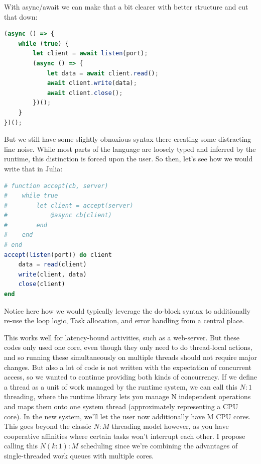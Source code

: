 \documentclass{juliacon}
\begin{document}
With async/await we can make that a bit clearer with better structure and cut that down:
\begin{lstlisting}[language = JavaScript]
(async () => {
    while (true) {
        let client = await listen(port);
        (async () => {
            let data = await client.read();
            await client.write(data);
            await client.close();
        })();
    }
})();
\end{lstlisting}

But we still have some slightly obnoxious syntax there creating some distracting line noise. While most parts of the language are loosely typed and inferred by the runtime, this distinction is forced upon the user. So then, let's see how we would write that in Julia:

\begin{lstlisting}[language = Julia]
# function accept(cb, server)
#    while true
#        let client = accept(server)
#            @async cb(client)
#        end
#    end
# end
accept(listen(port)) do client
    data = read(client)
    write(client, data)
    close(client)
end
\end{lstlisting}

Notice here how we would typically leverage the do-block syntax to additionally re-use the loop logic, Task allocation, and error handling from a central place.

This works well for latency-bound activities, such as a web-server. But these codes only used one core, even though they only need to do thread-local actions, and so running these simultaneously on multiple threads should not require major changes. But also a lot of code is not written with the expectation of concurrent access, so we wanted to continue providing both kinds of concurrency. If we define a thread as a unit of work managed by the runtime system, we can call this $N:1$ threading, where the runtime library lets you manage N independent operations and maps them onto one system thread (approximately representing a CPU core). In the new system, we'll let the user now additionally have M CPU cores. This goes beyond the classic $N:M$ threading model however, as you have cooperative affinities where certain tasks won't interrupt each other. I propose calling this $N(k:1):M$ scheduling since we're combining the advantages of single-threaded work queues with multiple cores.
\end{document}
